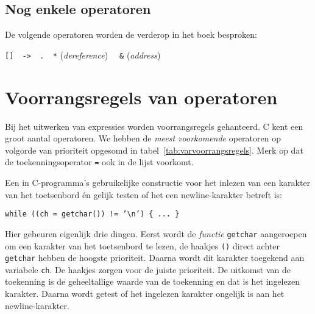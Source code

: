 \subsection{Nog enkele operatoren}
De volgende operatoren worden de verderop in het boek besproken:

\hspace*{1cm}\texttt{[]\ \ ->\ \ .\ \ *} (\textsl{dereference}) \texttt{\ \ \&} (\textsl{address})

\section{Voorrangsregels van operatoren}
Bij het uitwerken van expressies worden voorrangsregels gehanteerd. C kent een groot aantal operatoren. We hebben de \textsl{meest voorkomende} operatoren op volgorde van prioriteit opgesomd in tabel~\ref{tab:varvoorrangsregels}. Merk op dat de toekenningsoperator \texttt{=} ook in de lijst voorkomt.

Een in C-programma's gebruikelijke constructie voor het inlezen van een karakter van het toetsenbord én gelijk testen of het een newline-karakter betreft is:

\hspace*{1em}\texttt{while ((ch = getchar()) != '\textbackslash n') \{ ... \}}

Hier gebeuren eigenlijk drie dingen. Eerst wordt de \textsl{functie} \texttt{getchar} aangeroepen om een karakter van het toetsenbord te lezen, de haakjes \texttt{()} direct achter \texttt{getchar} hebben de hoogste prioriteit. Daarna wordt dit karakter toegekend aan variabele \texttt{ch}. De haakjes zorgen voor de juiste prioriteit. De uitkomst van de toekenning is de geheeltallige waarde van de toekenning en dat is het ingelezen karakter. Daarna wordt getest of het ingelezen karakter ongelijk is aan het newline-karakter.

